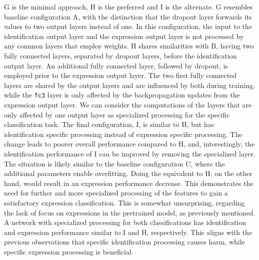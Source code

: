 \noindent G is the minimal approach, H is the preferred and I is the alternate. G resembles baseline configuration A, with the distinction that the dropout layer forwards its values to two output layers instead of one. In this configuration, the input to the identification output layer and the expression output layer is not processed by any common layers that employ weights. H shares similarities with B, having two fully connected layers, separated by dropout layers, before the identification output layer. An additional fully connected layer, followed by dropout, is employed prior to the expression output layer. The two first fully connected layers are shared by the output layers and are influenced by both during training, while the \texttt{fc3} layer is only affected by the backpropagation updates from the expression output layer. We can consider the computations of the layers that are only affected by one output layer as specialized processing for the specific classification task. The final configuration, I, is similar to H, but has identification specific processing instead of expression specific processing. The change leads to poorer overall performance compared to H, and, interestingly, the identification performance of I can be improved by removing the specialized layer. The situation is likely similar to the baseline configuration C, where the additional parameters enable overfitting. Doing the equivalent to H, on the other hand, would result in an expression performance decrease. This demonstrates the need for further and more specialized processing of the features to gain a satisfactory expression classification. This is somewhat unsurprising, regarding the lack of focus on expressions in the pretrained model, as previously mentioned. A network with specialized processing for both classifications has identification and expression performance similar to I and H, respectively. This aligns with the previous observations that specific identification processing causes harm, while specific expression processing is beneficial.

